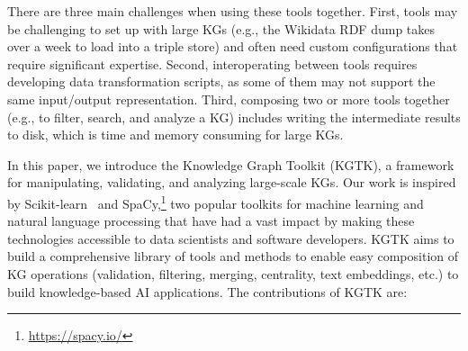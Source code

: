 \documentclass[runningheads]{llncs}
\newcommand{\kibitz}[2]{%
{\color{#1}#2}{}%
}
\newcommand{\pedro}[1]{\kibitz{orange}{[PS: #1]}} %
\newcommand{\DS}[1]{\kibitz{blue}{[DS: #1]}} %
\newcommand{\DG}[1]{\kibitz{red}{[DG: #1]}} %
\begin{document}
There are three main challenges when using these tools together. First, tools may be challenging to set up with large KGs (e.g., the Wikidata RDF dump takes over a week to load into a triple store) and often need custom configurations that require significant expertise. Second, interoperating between tools requires developing data transformation scripts, as some of them may not support the same input/output representation. Third, composing two or more tools together (e.g., to filter, search, and analyze a KG) includes writing the intermediate results to disk, which is time and memory consuming for large KGs. %


In this paper, we introduce the Knowledge Graph Toolkit (KGTK), a framework for manipulating, validating, and analyzing large-scale KGs. Our work is inspired by Scikit-learn~\cite{scikit-learn} and SpaCy,\footnote{\url{https://spacy.io/}} two popular toolkits for machine learning and natural language processing that have had a vast impact by making these technologies accessible to data scientists and software developers. KGTK aims to build a comprehensive library of tools and methods to enable easy composition of KG operations (validation, filtering, merging, centrality, text embeddings, etc.) to build knowledge-based AI applications. The contributions of KGTK are:
\end{document}

